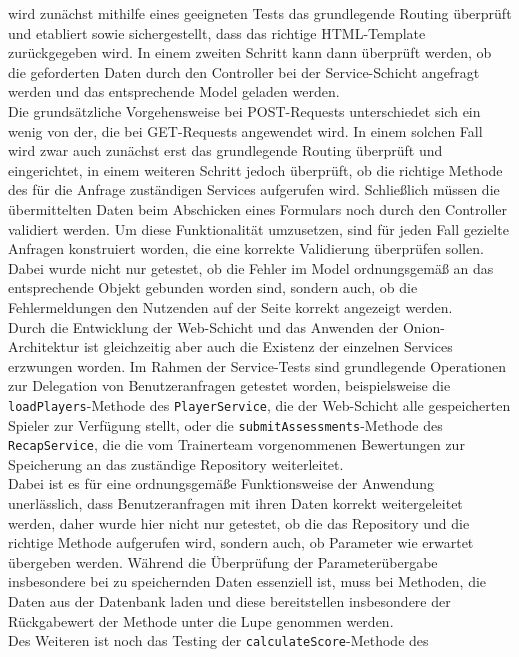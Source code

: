 wird zunächst mithilfe eines geeigneten Tests das grundlegende Routing überprüft und 
etabliert sowie sichergestellt, dass das richtige HTML-Template zurückgegeben wird. 
In einem zweiten Schritt kann dann überprüft werden, ob die geforderten Daten durch den 
Controller bei der Service-Schicht angefragt werden und das entsprechende Model geladen 
werden. \\ 
Die grundsätzliche Vorgehensweise bei POST-Requests unterschiedet sich ein wenig von der, 
die bei GET-Requests angewendet wird. In einem solchen Fall wird zwar auch zunächst erst 
das grundlegende Routing überprüft und eingerichtet, in einem weiteren Schritt jedoch 
überprüft, ob die richtige Methode des für die Anfrage zuständigen Services aufgerufen 
wird. Schließlich müssen die übermittelten Daten beim Abschicken eines Formulars noch 
durch den Controller validiert werden. Um diese Funktionalität umzusetzen, sind für 
jeden Fall gezielte Anfragen konstruiert worden, die eine korrekte Validierung 
überprüfen sollen. Dabei wurde nicht nur getestet, ob die Fehler im Model ordnungsgemäß 
an das entsprechende Objekt gebunden worden sind, sondern auch, ob die Fehlermeldungen 
den Nutzenden auf der Seite korrekt angezeigt werden. \\ 
Durch die Entwicklung der Web-Schicht und das Anwenden der Onion-Architektur ist 
gleichzeitig aber auch die Existenz der einzelnen Services erzwungen worden. Im Rahmen 
der Service-Tests sind grundlegende Operationen zur Delegation von Benutzeranfragen 
getestet worden, beispielsweise die \texttt{loadPlayers}-Methode des 
\texttt{PlayerService}, die der Web-Schicht alle gespeicherten Spieler zur Verfügung 
stellt, oder die \texttt{submitAssessments}-Methode des \texttt{RecapService}, die 
die vom Trainerteam vorgenommenen Bewertungen zur Speicherung an das zuständige 
Repository weiterleitet. \\ 
Dabei ist es für eine ordnungsgemäße Funktionsweise der Anwendung unerlässlich, dass 
Benutzeranfragen mit ihren Daten korrekt weitergeleitet werden, daher wurde hier nicht 
nur getestet, ob die das Repository und die richtige Methode aufgerufen wird, sondern 
auch, ob Parameter wie erwartet übergeben werden. Während die Überprüfung der 
Parameterübergabe insbesondere bei zu speichernden Daten essenziell ist, muss bei 
Methoden, die Daten aus der Datenbank laden und diese bereitstellen insbesondere der 
Rückgabewert der Methode unter die Lupe genommen werden. \\ 
Des Weiteren ist noch das Testing der \texttt{calculateScore}-Methode des 
